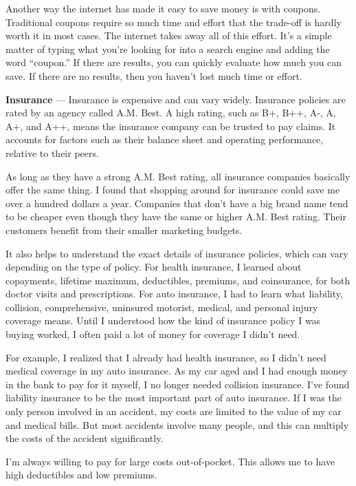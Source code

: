 Another way the internet has made it easy to save money is with coupons. Traditional coupons require so much time and effort that the trade-off is hardly worth it in most cases. The internet takes away all of this effort. It's a simple matter of typing what you're looking for into a search engine and adding the word ``coupon.'' If there are results, you can quickly evaluate how much you can save. If there are no results, then you haven't lost much time or effort.

\textbf{Insurance} --- Insurance is expensive and can vary widely. Insurance policies are rated by an agency called A.M. Best. A high rating, such as B+, B++, A-, A, A+, and A++, means the insurance company can be trusted to pay claims. It accounts for factors such as their balance sheet and operating performance, relative to their peers.

As long as they have a strong A.M. Best rating, all insurance companies basically offer the same thing. I found that shopping around for insurance could save me over a hundred dollars a year. Companies that don't have a big brand name tend to be cheaper even though they have the same or higher A.M. Best rating. Their customers benefit from their smaller marketing budgets.

It also helps to understand the exact details of insurance policies, which can vary depending on the type of policy. For health insurance, I learned about copayments, lifetime maximum, deductibles, premiums, and coinsurance, for both doctor visits and prescriptions. For auto insurance, I had to learn what liability, collision, comprehensive, uninsured motorist, medical, and personal injury coverage means. Until I understood how the kind of insurance policy I was buying worked, I often paid a lot of money for coverage I didn't need.

For example, I realized that I already had health insurance, so I didn't need medical coverage in my auto insurance. As my car aged and I had enough money in the bank to pay for it myself, I no longer needed collision insurance. I've found liability insurance to be the most important part of auto insurance. If I was the only person involved in an accident, my costs are limited to the value of my car and medical bills. But most accidents involve many people, and this can multiply the costs of the accident significantly.

I'm always willing to pay for large costs out-of-pocket. This allows me to have high deductibles and low premiums.

